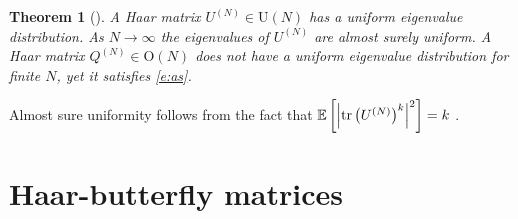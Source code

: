 \documentclass{amsart}
\newtheorem{theorem}{Theorem}[section]
\theoremstyle{definition}
\theoremstyle{remark}
\numberwithin{equation}{section}
\DeclareMathOperator{\tr}{tr}
\begin{document}
\begin{theorem}[\cite{Diaconis1994}]
A Haar matrix $U^{(N)} \in \mathrm{U}(N)$ has a uniform eigenvalue distribution.  As $N \to \infty$ the eigenvalues of $U^{(N)}$ are almost surely uniform.  A Haar matrix $Q^{(N)} \in \mathrm{O}(N)$ does not have a uniform eigenvalue distribution for finite $N$, yet it satisfies \eqref{e:as}.  
\end{theorem}

\noindent Almost sure uniformity follows from the fact that $\mathbb E \left[\left| \tr \left( U\pp{N} \right)^k \right|^2 \right] = k$ \cite{Diaconis1994} .       

\section{Haar-butterfly matrices}\label{s:haarbutt}
\end{document}
